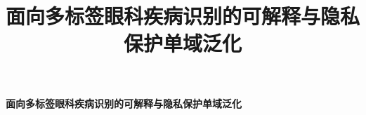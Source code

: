 \documentclass[a4paper,12pt]{article}
\title{面向多标签眼科疾病识别的可解释与隐私保护单域泛化}
\author{}
\date{}
\begin{document}
\begin{center}
{\bfseries 面向多标签眼科疾病识别的可解释与隐私保护单域泛化\par}
\end{center}
\vspace{0.8em}
\thispagestyle{empty}








\end{document}
